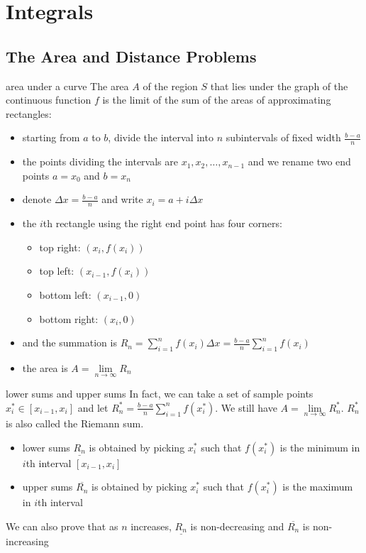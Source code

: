 \documentclass[Calculus 1 Recitation.tex]{subfiles}
\begin{document}
\section{Integrals}
\subsection{The Area and Distance Problems}
\begin{myleftlinebox}
	area under a curve
	\tcblower
	The area $A$ of the region $S$ that lies under the graph of the continuous function $f$ is the limit of the sum of the areas of approximating rectangles:
	\begin{itemize}
		\item starting from $a$ to $b$, divide the interval into $n$  subintervals of fixed width $\frac{b-a}{n}$
		\item the points dividing the intervals are $x_1, x_2,\dots, x_{n-1}$ and we rename two end points $a=x_0$ and $b=x_n$ 
		\item denote $\Delta x=\frac{b-a}{n}$ and write $x_i=a+i\Delta x$
		\item the $i$th rectangle using the right end point has four corners:
		\begin{itemize}
			\item top right: $(x_i,f(x_i))$
			\item top left: $(x_{i-1},f(x_i))$
			\item bottom left: $(x_{i-1},0)$
			\item bottom right: $(x_i,0)$
		\end{itemize}
		\item and the summation is $R_n=\sum_{i=1}^n f(x_i)\Delta x=\frac{b-a}{n}\sum_{i=1}^n f(x_i)$
		\item the area is $A=\lim\limits_{n\to\infty} R_n$
	\end{itemize}
\end{myleftlinebox}

\begin{myleftlinebox}
	lower sums and upper sums
	\tcblower
	In fact, we can take a set of sample points $x_i^*\in[x_{i-1},x_i]$ and let $R_n^* = \frac{b-a}{n}\sum_{i=1}^{n} f(x_i^*)$. We still have $A = \lim\limits_{n\to\infty} R_n^*$. $R_n^*$ is also called the Riemann sum.
	\begin{itemize}
		\item lower sums $\underline{R_n}$ is obtained by picking $x_i^*$ such that $f(x_i^*)$ is the minimum in $i$th interval $[x_{i-1},x_i]$
		\item upper sums $\overline{R_n}$ is obtained by picking $x_i^*$ such that $f(x_i^*)$ is the maximum in $i$th interval
	\end{itemize}
	\begin{remark}
		We can also prove that as $n$ increases, $\underline{R_n}$ is non-decreasing and $\overline{R_n}$ is non-increasing
	\end{remark}
\end{myleftlinebox}
\end{document}

